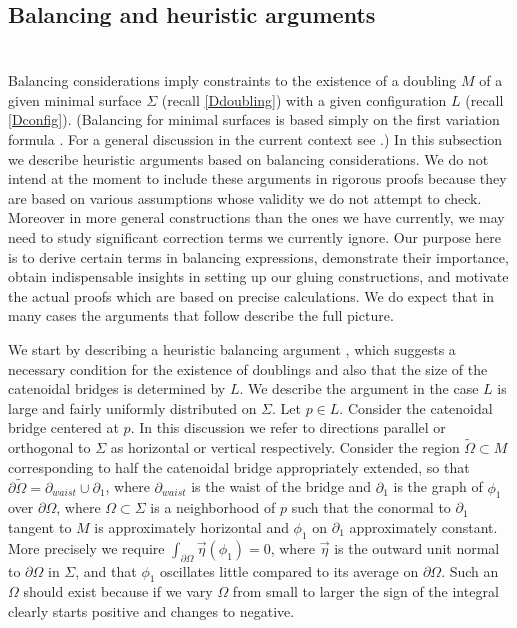 \documentclass[12pt,namelimits,sumlimits]{amsart}
\theoremstyle{remark}
\numberwithin{equation}{section}
\begin{document}
\subsection*{Balancing and heuristic arguments}
$\phantom{ab}$
\nopagebreak

Balancing considerations imply constraints to the existence of a doubling $M$ of a given
minimal surface $\Sigma$ (recall \ref{Ddoubling})
with a given configuration $L$ (recall \ref{Dconfig}).
(Balancing for minimal surfaces 
is based simply on the first variation formula \cite{KKS,Si}.
For a general discussion in the current context see \cite{kapouleas:survey}.)
In this subsection we describe heuristic arguments based on balancing considerations.
We do not intend at the moment to include these arguments in rigorous proofs because
they are based on various assumptions
whose validity we do not attempt to check.
Moreover in more general constructions than the ones we have currently,
we may need to study significant correction terms we currently ignore.
Our purpose here is to derive certain terms in balancing expressions,
demonstrate their importance,
obtain indispensable insights in setting up our gluing constructions,
and motivate the actual proofs which are based on precise calculations.
We do expect that in many cases the arguments that follow describe the full picture.

We start by describing a heuristic balancing argument \cite{kapouleas:clifford},
which suggests a necessary condition for the existence of doublings
and also that the size of the catenoidal bridges is determined by $L$.
We describe the argument in the case $L$ is large and fairly uniformly distributed on $\Sigma$.
Let $p\in L$.
Consider the catenoidal bridge centered at $p$.
In this discussion we refer to directions parallel or orthogonal to $\Sigma$ as horizontal or vertical
respectively.
Consider the region $\widetilde{\Omega}\subset M$ corresponding to half the catenoidal bridge
appropriately extended,
so that $\partial\widetilde{\Omega}=\partial_{waist}\cup\partial_1$,
where $\partial_{waist}$ is the waist of the bridge 
and $\partial_1$ is the graph of $\phi_1$ over
$\partial\Omega$,
where $\Omega\subset\Sigma$ is a neighborhood of $p$
such that the conormal to $\partial_1$ tangent to $M$ is approximately horizontal
and $\phi_1$ on $\partial_1$ approximately constant.
More precisely we require $\int_{\partial\Omega}\vec{\eta}(\phi_1)=0$,
where $\vec{\eta}$ is the outward unit normal to $\partial\Omega$ in $\Sigma$,
and that $\phi_1$ oscillates little compared to its average on $\partial\Omega$.
Such an $\Omega$ should exist because if we vary $\Omega$ from small
to larger the sign of the integral clearly starts positive and changes to negative.
\end{document}

